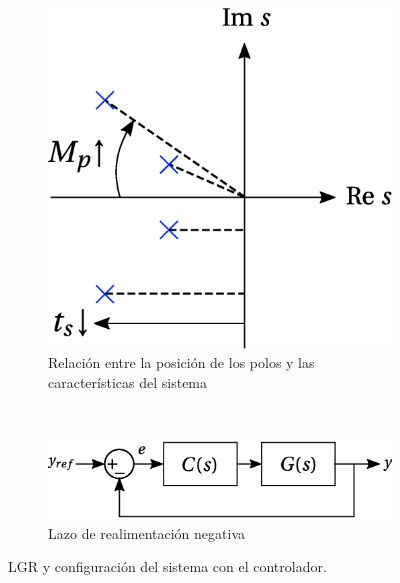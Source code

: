 \begin{figure}[t]
    \centering
    \begin{subfigure}[b]{0.49\textwidth}
    \centering
        \includegraphics[scale=0.25]{../img/Diseno_de_un_controlador_de_velocidad/lgr.eps}
        \caption{Relación entre la posición de los polos y las características del sistema}
        \label{fig:lgr}
    \end{subfigure}
    ~ %
    \begin{subfigure}[b]{0.49\textwidth}
    \centering
        \includegraphics[scale=0.3]{../img/Diseno_de_un_controlador_de_velocidad/feedback.eps}
        \caption{Lazo de realimentación negativa}
        \label{fig:feedback}
    \end{subfigure}
    \caption{LGR y configuración del sistema con el controlador.}\label{fig:lgrfeedback}
\end{figure}

